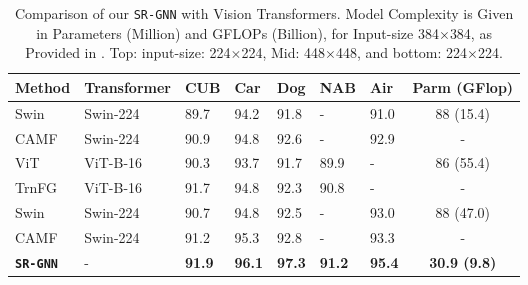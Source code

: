 \documentclass[journal]{IEEEtran}
\begin{document}
\begin{table}[h]
\vspace{ -0.3cm}
\begin{center}
 \caption{ Comparison of our \texttt{SR-GNN} with Vision Transformers. 
 Model Complexity is Given in Parameters (Million) and GFLOPs (Billion), for Input-size 384$\times$384, as Provided in \cite{liu2021swin}. Top: input-size: 224$\times$224, Mid: 448$\times$448, 
 and bottom: 224$\times$224. }
  \label{table:ViT}
 \vspace{ -0.3cm}
\begin{tabular}{|p{14 mm}|p{11.0 mm} p{2.5 mm} p{2.8 mm} p{2.8 mm} p{3.2 mm} p{3.3 mm}|c|}
 \hline
Method & Transformer & CUB & Car  & Dog & NAB  & Air & Parm (GFlop)\\
    \hline
Swin \cite{liu2021swin} & Swin-224 & 89.7 &94.2  &91.8 &- &91.0 & 88 (15.4)\\
CAMF \cite{miao2021complemental} & Swin-224 & 90.9 &94.8  &92.6 &-  &92.9 &-\\
\hline
ViT \cite{dosovitskiy2020image} & ViT-B-16 & 90.3 &93.7  &91.7 &89.9 &-   &86 (55.4)\\
TrnFG \cite{he2021transfg} & ViT-B-16 & 91.7 &94.8  &92.3 & 90.8 &- &-\\
Swin \cite{liu2021swin} & Swin-224 & 90.7 &94.8  &92.5 &-  &93.0 & 88 (47.0)\\
CAMF \cite{miao2021complemental} & Swin-224 & 91.2 &95.3  &92.8 &-  &93.3 &-\\
\hline
\textbf{\texttt{SR-GNN}} &- &\textbf{91.9} & \textbf{96.1} & \textbf{97.3} & \textbf{91.2}  & \textbf{95.4} & \textbf{30.9 (9.8)}\\
\hline
\end{tabular}
 \end{center}
  \vspace{- 0.3 cm}
\end{table}
\end{document}
